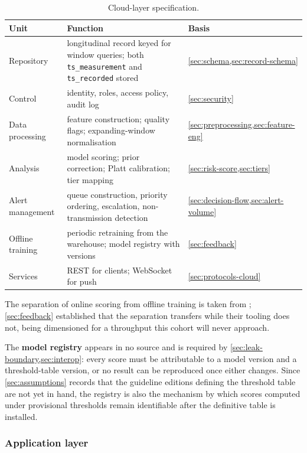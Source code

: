 \documentclass[12pt,a4paper,oneside]{report}
\begin{document}
\begin{table}[htbp]
\centering\small
\caption{Cloud-layer specification.}\label{tab:cloud-layer}
\begin{tabularx}{\textwidth}{@{}>{\raggedright\arraybackslash}p{2.8cm} X >{\raggedright\arraybackslash}p{3.1cm}@{}}
\toprule
\textbf{Unit} & \textbf{Function} & \textbf{Basis} \\
\midrule
Repository & longitudinal record keyed for window queries; both \texttt{ts\_measurement} and \texttt{ts\_recorded} stored & \cref{sec:schema,sec:record-schema} \\
Control & identity, roles, access policy, audit log & \cref{sec:security} \\
Data processing & feature construction; quality flags; expanding-window normalisation & \cref{sec:preprocessing,sec:feature-eng} \\
Analysis & model scoring; prior correction; Platt calibration; tier mapping & \cref{sec:risk-score,sec:tiers} \\
Alert management & queue construction, priority ordering, escalation, non-transmission detection & \cref{sec:decision-flow,sec:alert-volume} \\
Offline training & periodic retraining from the warehouse; model registry with versions & \cref{sec:feedback} \\
Services & REST for clients; WebSocket for push & \cref{sec:protocols-cloud} \\
\bottomrule
\end{tabularx}
\end{table}

The separation of online scoring from offline training is taken from \textcite{liu2025review}; \cref{sec:feedback} established that the separation transfers while their tooling does not, being dimensioned for a throughput this cohort will never approach.

The \textbf{model registry} appears in no source and is required by \cref{sec:leak-boundary,sec:interop}: every score must be attributable to a model version and a threshold-table version, or no result can be reproduced once either changes. Since \cref{sec:assumptions} records that the guideline editions defining the threshold table are not yet in hand, the registry is also the mechanism by which scores computed under provisional thresholds remain identifiable after the definitive table is installed.

\subsubsection{Application layer}\label{sec:application-layer}
\end{document}
